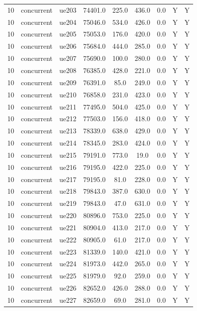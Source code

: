 \begin{table}[ht]
\begin{tabular}{|c|c|c|c|c|c|c|c|c|}
10 & concurrent & ue203 & 74401.0 & 225.0 & 436.0 & 0.0 & Y & Y \\
10 & concurrent & ue204 & 75046.0 & 534.0 & 426.0 & 0.0 & Y & Y \\
10 & concurrent & ue205 & 75053.0 & 176.0 & 420.0 & 0.0 & Y & Y \\
10 & concurrent & ue206 & 75684.0 & 444.0 & 285.0 & 0.0 & Y & Y \\
10 & concurrent & ue207 & 75690.0 & 100.0 & 280.0 & 0.0 & Y & Y \\
10 & concurrent & ue208 & 76385.0 & 428.0 & 221.0 & 0.0 & Y & Y \\
10 & concurrent & ue209 & 76391.0 & 85.0 & 249.0 & 0.0 & Y & Y \\
10 & concurrent & ue210 & 76858.0 & 231.0 & 423.0 & 0.0 & Y & Y \\
10 & concurrent & ue211 & 77495.0 & 504.0 & 425.0 & 0.0 & Y & Y \\
10 & concurrent & ue212 & 77503.0 & 156.0 & 418.0 & 0.0 & Y & Y \\
10 & concurrent & ue213 & 78339.0 & 638.0 & 429.0 & 0.0 & Y & Y \\
10 & concurrent & ue214 & 78345.0 & 283.0 & 424.0 & 0.0 & Y & Y \\
10 & concurrent & ue215 & 79191.0 & 773.0 & 19.0 & 0.0 & Y & Y \\
10 & concurrent & ue216 & 79195.0 & 422.0 & 225.0 & 0.0 & Y & Y \\
10 & concurrent & ue217 & 79195.0 & 81.0 & 228.0 & 0.0 & Y & Y \\
10 & concurrent & ue218 & 79843.0 & 387.0 & 630.0 & 0.0 & Y & Y \\
10 & concurrent & ue219 & 79843.0 & 47.0 & 631.0 & 0.0 & Y & Y \\
10 & concurrent & ue220 & 80896.0 & 753.0 & 225.0 & 0.0 & Y & Y \\
10 & concurrent & ue221 & 80904.0 & 413.0 & 217.0 & 0.0 & Y & Y \\
10 & concurrent & ue222 & 80905.0 & 61.0 & 217.0 & 0.0 & Y & Y \\
10 & concurrent & ue223 & 81339.0 & 140.0 & 421.0 & 0.0 & Y & Y \\
10 & concurrent & ue224 & 81973.0 & 442.0 & 265.0 & 0.0 & Y & Y \\
10 & concurrent & ue225 & 81979.0 & 92.0 & 259.0 & 0.0 & Y & Y \\
10 & concurrent & ue226 & 82652.0 & 426.0 & 288.0 & 0.0 & Y & Y \\
10 & concurrent & ue227 & 82659.0 & 69.0 & 281.0 & 0.0 & Y & Y \\

\end{tabular}
\end{table}

